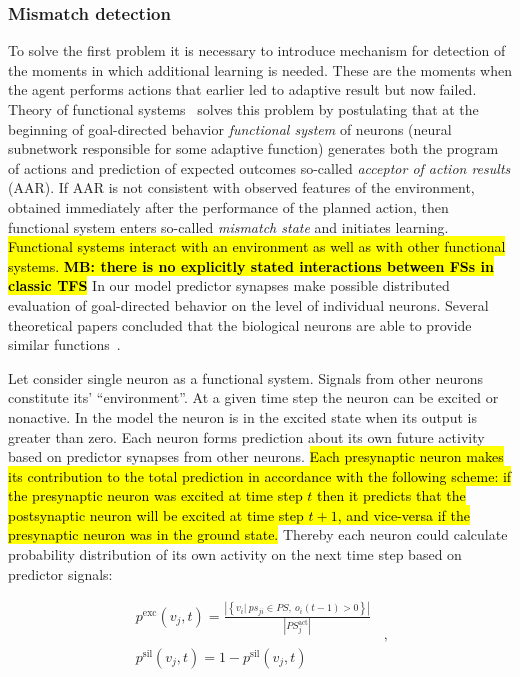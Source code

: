 \documentclass[letterpaper]{article}
\begin{document}
\subsubsection{Mismatch detection} To solve the first problem it is necessary to introduce mechanism for detection of the moments in which additional learning is needed. These are the moments when the agent performs actions that earlier led to adaptive result but now failed. Theory of functional systems~\citep{Anokhin1974} solves this problem by postulating that at the beginning of goal-directed behavior {\em functional system} of neurons (neural subnetwork responsible for some adaptive function) generates both the program of actions and prediction of expected outcomes so-called {\em acceptor of action results} (AAR). If AAR is not consistent with observed features of the environment, obtained immediately after the performance of the planned action, then functional system enters so-called {\em mismatch state} and initiates learning. \hl{Functional systems interact with an environment as well as with other functional systems. \textbf{MB: there is no explicitly stated interactions between FSs in classic TFS}} In our model predictor synapses make possible distributed evaluation of goal-directed behavior on the level of individual neurons. Several theoretical papers concluded that the biological neurons are able to provide similar functions~\citep{Fiorillo2008}.

Let consider single neuron as a functional system. Signals from other neurons constitute its' ``environment''. At a given time step the neuron can be excited or nonactive. 
In the model the neuron is in the excited state when its output is greater than zero. 
Each neuron forms prediction about its own future activity based on predictor synapses from other neurons. 
\hl{Each presynaptic neuron makes its contribution to the total prediction in accordance with the following scheme: if the presynaptic neuron was excited at time step $t$ then it predicts that the postsynaptic neuron will be excited at time step $t+1$, and vice-versa if the presynaptic neuron was in the ground state.}
Thereby each neuron could calculate probability distribution of its own activity on the next time step based on predictor signals:

\begin{equation}
	\label{eq3}
	\begin{array}{c}
		p^{\mathrm{exc}}\left(v_{j}, t\right) = \frac{\left\vert\left\{v_{i} | \ ps_{ji} \in PS,\ o_{i}\left(t-1\right)>0\right\}\right\vert}
			{\left\vert PS_{j}^{\mathrm{act}}\right\vert} \\
			\\
		p^{\mathrm{sil}}\left(v_{j}, t\right) = 1 - p^{\mathrm{sil}}\left(v_{j}, t\right)
	\end{array}
	\enspace , 
\end{equation}      
\end{document}
